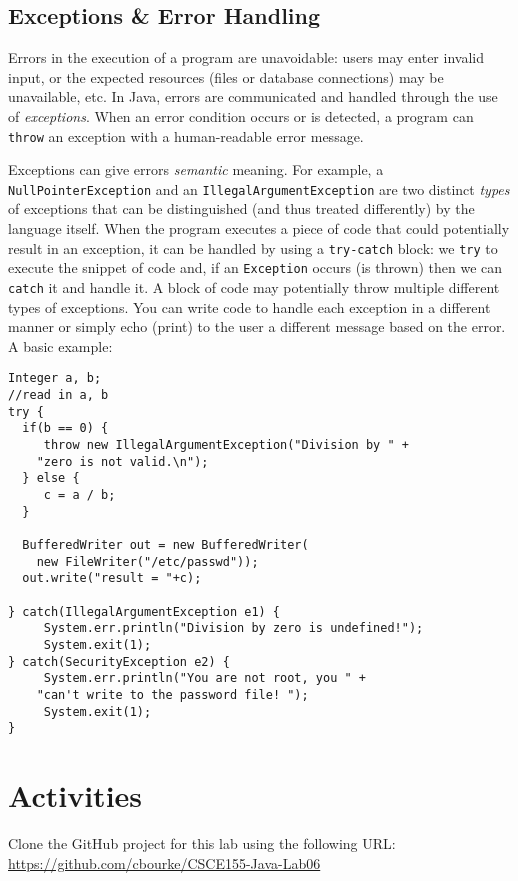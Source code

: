 \documentclass[12pt]{scrartcl}
\begin{document}
\subsection*{Exceptions \& Error Handling}

Errors in the execution of a program are unavoidable: users may enter 
invalid input, or the expected resources (files or database connections) 
may be unavailable, etc.  In Java, errors are communicated and handled through 
the use of \emph{exceptions}.  When an error condition occurs or is detected, 
a program can \texttt{throw} an exception with a 
human-readable error message.  

Exceptions can give errors \emph{semantic} meaning.  For example, 
a \texttt{NullPointerException} and an 
\texttt{IllegalArgumentException} are two distinct 
\emph{types} of exceptions that can be distinguished (and thus
treated differently) by the language itself.  
When the program executes a piece of code 
that could potentially result in an exception, it can be handled by using 
a \texttt{try-catch} block: we \texttt{try} to
execute the snippet of code and, if an \texttt{Exception}
occurs (is thrown) then we can \texttt{catch} it and
handle it.  A block of code may potentially throw multiple different
types of exceptions.  You can write code to handle each exception in a 
different manner or simply echo (print) to the user a different message 
based on the error.  A basic example:

\begin{verbatim}
Integer a, b;
//read in a, b
try { 
  if(b == 0) {
     throw new IllegalArgumentException("Division by " +
	"zero is not valid.\n");
  } else {
     c = a / b;
  }

  BufferedWriter out = new BufferedWriter(
	new FileWriter("/etc/passwd"));
  out.write("result = "+c);

} catch(IllegalArgumentException e1) {
     System.err.println("Division by zero is undefined!");
     System.exit(1);
} catch(SecurityException e2) {
     System.err.println("You are not root, you " +
	"can't write to the password file! ");
     System.exit(1);
}
\end{verbatim}


\section{Activities}

Clone the GitHub project for this lab using the following URL:
\url{https://github.com/cbourke/CSCE155-Java-Lab06}
\end{document}
